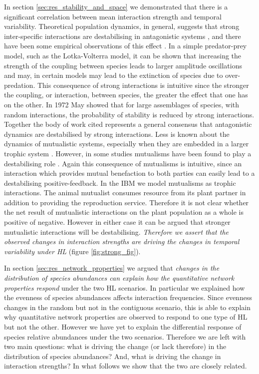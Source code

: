 In section \ref{sec:res_stability_and_space} we demonstrated that there is a significant correlation between mean interaction strength and temporal variability. Theoretical population dynamics, in general, suggests that strong inter-specific interactions are destabilising in antagonistic systems \cite{may1972will,mccann1998weak,neutel2002stability,kokkoris1999patterns,coyte2015ecology}, and there have been some empirical observations of this effect \cite{o2009perturbations}. In a simple predator-prey model, such as the Lotka-Volterra model, it can be shown that increasing the strength of the coupling between species leads to larger amplitude oscillations and may, in certain models may lead to the extinction of species due to over-predation. This consequence of strong interactions is intuitive since the stronger the coupling, or interaction, between species, the greater the effect that one has on the other. In 1972 May showed \cite{may1972will} that for large assemblages of species, with random interactions, the probability of stability is reduced by strong interactions. Together the body of work cited represents a general consensus that antagonistic dynamics are destabilised by strong interactions. Less is known about the dynamics of mutualistic systems, especially when they are embedded in a larger trophic system \cite{lurgi2015effects,sauve2014structure}. However, in some studies mutualisms have been found to play a destabilising role \cite{coyte2015ecology,may1981patterns}. Again this consequence of mutualisms is intuitive, since an interaction which provides mutual benefaction to both parties can easily lead to a destabilising positive-feedback. In the IBM we model mutualisms as trophic interactions. The animal mutualist consumes resource from its plant partner in addition to providing the reproduction service. Therefore it is not clear whether the net result of mutualistic interactions on the plant population as a whole is positive of negative. However in either case it can be argued that stronger mutualistic interactions will be destabilising. \emph{Therefore we assert that the observed changes in interaction strengths are driving the changes in temporal variability under HL} (figure \ref{fig:strong_fig}). 

In section \ref{sec:res_network_properties} we argued that \emph{changes in the distribution of species abundances can explain how the quantitative network properties respond} under the two HL scenarios. In particular we explained how the evenness of species abundances affects interaction frequencies. Since evenness changes in the random but not in the contiguous scenario, this is able to explain why quantitative network properties are observed to respond to one type of HL but not the other. However we have yet to explain the differential response of species relative abundances under the two scenarios. Therefore we are left with two main questions: what is driving the change (or lack therefore) in the distribution of species abundances? And, what is driving the change in interaction strengths? In what follows we show that the two are closely related.  

